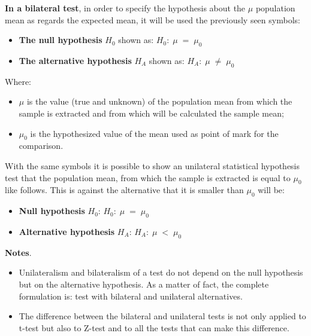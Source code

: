 \begin{frame}
  \vspace*{.25cm}
  \textbf{In a bilateral test}, in order to specify the hypothesis about the $ \mu $ population mean as regards the expected mean, it will be used the previously seen symbols:
  \vspace*{.25cm}
  \begin{itemize}
    \item \textbf{The null hypothesis} {\boldmath$H_0$} shown as: \hspace*{1.3cm} $H_0: \; \mu \; = \; \mu_0 $\\
    \item \textbf{The alternative hypothesis} {\boldmath$H_A$} shown as: $ H_A: \; \mu \; \ne \; \mu_0$\\
  \end{itemize}
  \vspace*{.25cm}
  Where:\\
  \vspace*{.25cm}
  \begin{itemize}
    \item $ \mu $ is the value (true and unknown) of the population mean from which the sample is extracted and from which will be calculated the sample mean;
    \vspace*{.25cm}
    \item $ \mu_0 $  is the hypothesized value of the mean used as point of mark for the comparison.
  \end{itemize}
\end{frame}

\begin{frame}
  \vspace*{.25cm}
  With the same symbols it is possible to show an unilateral statistical hypothesis test that the population mean, from which the sample is extracted is equal to $\mu_0$ like follows. This is against the alternative that it is smaller than $\mu_0$ will be:
  \begin{itemize}
    \item \textbf{Null hypothesis} {\boldmath $ H_0 $}:  \hspace*{1.45cm} $ H_0: \; \mu \; =\; \mu_0 $\\
    \item \textbf{Alternative hypothesis} {\boldmath $ H_A $}: \hspace*{.15cm} $ H_A: \; \mu \; <\; \mu_0 $\\
  \end{itemize}
  \vspace*{.25cm}
  \textbf{Notes}.
  \begin{itemize}
    \item Unilateralism and bilateralism of a test do not depend on the null hypothesis but on the alternative hypothesis. As a matter of fact, the complete formulation is: test with bilateral and unilateral alternatives.
    \item The difference between the bilateral and unilateral tests is not only applied to t-test but also to Z-test and to all the tests that can make this difference.
  \end{itemize}
\end{frame}

